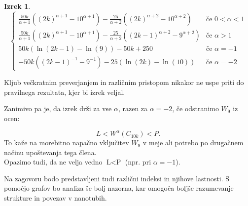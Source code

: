 \documentclass[a4paper, 12pt]{article}
\newtheorem{izrek}{Izrek}[section]
\begin{document}
\begin{izrek}
\begin{equation*}
\begin{cases}
            \frac{50k}{\alpha + 1} \left( (2k)^{\alpha + 1} - 10^{\alpha + 1} \right) - 
            \frac{25}{\alpha + 2} \left( (2k)^{\alpha + 2} - 10^{\alpha + 2} \right) & \text{če } 0 < \alpha < 1 \\
    
            \frac{50k}{\alpha + 1} \left( (2k)^{\alpha + 1} - 10^{\alpha + 1} \right) - 
            \frac{25}{\alpha + 2} \left( (2k-1)^{\alpha + 2} - 9^{\alpha + 2} \right) & \text{če } \alpha > 1 \\
    
            50k \left( \ln(2k-1) - \ln(9) \right) - 50k + 250 & \text{če } \alpha = -1 \\
    
            -50k \left( (2k-1)^{-1} - 9^{-1} \right) - 25 \left( \ln(2k) - \ln(10) \right) & \text{če } \alpha = -2
        \end{cases}
    \end{equation*}
    


    
\end{izrek}


{\color{red} 
   Kljub večkratnim preverjanjem in različnim pristopom nikakor ne uspe priti do pravilnega rezultata, 
   kjer bi izrek veljal. 
   
   Zanimivo pa je, da izrek drži za vse $\alpha$, razen za $\alpha = -2$, če odstranimo $W_9$ iz ocen:
}
\[
L < W^\alpha(C_{10k}) < P.
\]
{\color{red}
   To kaže na morebitno napačno vključitev $W_9$ v meje ali potrebo po drugačnem načinu upoštevanja tega člena. \\  
   Opazimo tudi, da ne velja vedno $ \text{L} < \text{P} $ (npr. pri $\alpha = -1$).
}


Na zagovoru bodo predstavljeni tudi različni indeksi in njihove lastnosti.
S pomočjo grafov bo analiza še bolj nazorna, kar omogoča boljše razumevanje strukture in povezav v nanotubih.
\end{document}
